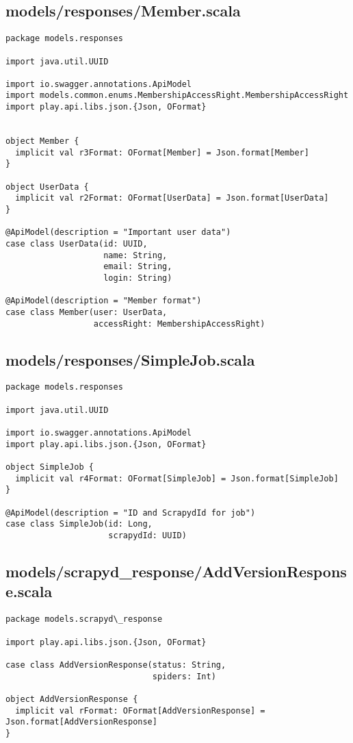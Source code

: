 \subsection{models/responses/Member.scala}
\begin{lstlisting}
package models.responses

import java.util.UUID

import io.swagger.annotations.ApiModel
import models.common.enums.MembershipAccessRight.MembershipAccessRight
import play.api.libs.json.{Json, OFormat}


object Member {
  implicit val r3Format: OFormat[Member] = Json.format[Member]
}

object UserData {
  implicit val r2Format: OFormat[UserData] = Json.format[UserData]
}

@ApiModel(description = "Important user data")
case class UserData(id: UUID,
                    name: String,
                    email: String,
                    login: String)

@ApiModel(description = "Member format")
case class Member(user: UserData,
                  accessRight: MembershipAccessRight)
\end{lstlisting}
\subsection{models/responses/SimpleJob.scala}
\begin{lstlisting}
package models.responses

import java.util.UUID

import io.swagger.annotations.ApiModel
import play.api.libs.json.{Json, OFormat}

object SimpleJob {
  implicit val r4Format: OFormat[SimpleJob] = Json.format[SimpleJob]
}

@ApiModel(description = "ID and ScrapydId for job")
case class SimpleJob(id: Long,
                     scrapydId: UUID)
\end{lstlisting}
\subsection{models/scrapyd\_response/AddVersionResponse.scala}
\begin{lstlisting}
package models.scrapyd\_response

import play.api.libs.json.{Json, OFormat}

case class AddVersionResponse(status: String,
                              spiders: Int)

object AddVersionResponse {
  implicit val rFormat: OFormat[AddVersionResponse] = Json.format[AddVersionResponse]
}
\end{lstlisting}
